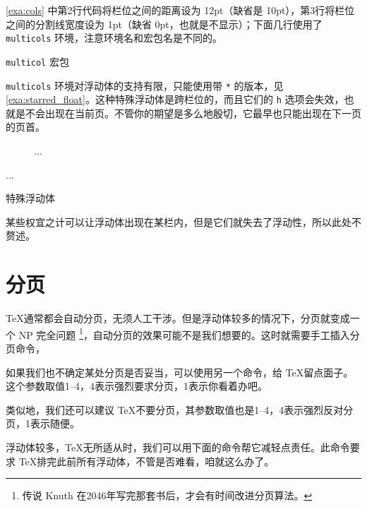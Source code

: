 \autoref{exa:cols} 中第2行代码将栏位之间的距离设为 12pt（缺省是 10pt），第3行将栏位之间的分割线宽度设为 1pt（缺省 0pt，也就是不显示）；下面几行使用了 \texttt{multicols} 环境，注意环境名和宏包名是不同的。

\begin{example}[htbp]
\caption{\texttt{multicol} 宏包}
\label{exa:cols}
\end{example}

\texttt{multicols} 环境对浮动体的支持有限，只能使用带 \texttt{*} 的版本，见 \autoref{exa:starred_float}。这种特殊浮动体是跨栏位的，而且它们的 \texttt{h} 选项会失效，也就是不会出现在当前页。不管你的期望是多么地殷切，它最早也只能出现在下一页的页首。

\begin{example}[htbp]
\begin{Code}[]
\begin{figure*}[tbp]
...
\end{figure*}

\begin{table*}[tbp]
...
\end{table*}
\end{Code}
\caption{特殊浮动体}
\label{exa:starred_float}
\end{example}

某些权宜之计可以让浮动体出现在某栏内，但是它们就失去了浮动性，所以此处不赘述。

\section{分页}

\TeX 通常都会自动分页，无须人工干涉。但是浮动体较多的情况下，分页就变成一个 NP 完全问题 \footnote{传说 Knuth 在2046年写完那套书后，才会有时间改进分页算法。}，自动分页的效果可能不是我们想要的。这时就需要手工插入分页命令，

\begin{Code}[numbers=none]
\newpage
\end{Code}

如果我们也不确定某处分页是否妥当，可以使用另一个命令，给 \TeX 留点面子。这个参数取值1--4，4表示强烈要求分页，1表示你看着办吧。

\begin{Code}[numbers=none]
\pagebreak[3]
\end{Code}

类似地，我们还可以建议 \TeX 不要分页，其参数取值也是1--4，4表示强烈反对分页，1表示随便。

\begin{Code}[numbers=none]
\nopagebreak[2]
\end{Code}

浮动体较多，\TeX 无所适从时，我们可以用下面的命令帮它减轻点责任。此命令要求 \TeX 排完此前所有浮动体，不管是否难看，咱就这么办了。

\begin{Code}[numbers=none]
\clearpage
\end{Code}



